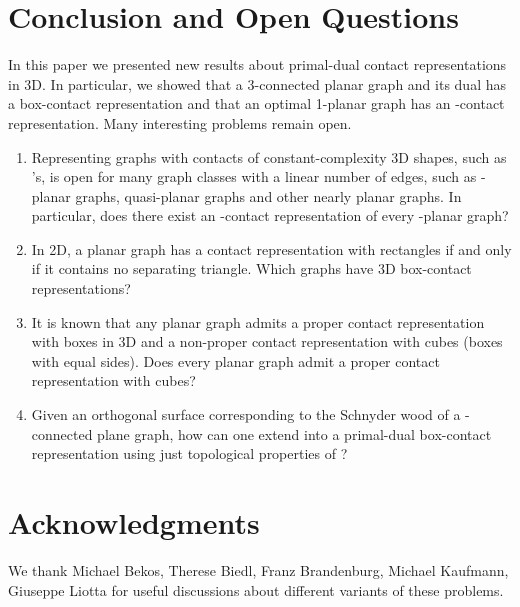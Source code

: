 \documentclass{article}
\newcommand{\LL}{\xspace}
\newcommand{\LLs}{'s\xspace}
\begin{document}
\section{Conclusion and Open Questions}
In this paper we presented new results about primal-dual contact representations in 3D. In particular, we showed that a 3-connected planar graph and its dual has a box-contact representation and that an optimal 1-planar graph has an \LL-contact representation. Many interesting problems remain open.


\begin{enumerate}
\item Representing graphs with contacts of constant-complexity 3D shapes, such as \LLs, is open for many graph
classes with a linear number of edges, such as -planar graphs, quasi-planar graphs and other nearly planar
graphs. In particular, does there exist an \LL-contact representation of every -planar graph?

\item In 2D, a planar graph has a contact representation with rectangles if and only if it
contains no separating triangle.
Which graphs have 3D box-contact representations?

\item It is known that any planar graph admits a proper contact representation
with boxes in 3D and a non-proper contact representation with cubes (boxes with equal sides).
Does every planar graph admit a proper contact representation with cubes?

\item Given an orthogonal surface  corresponding to the Schnyder wood of a -connected plane graph, how can one extend  into a primal-dual box-contact representation using just topological properties of ?
\end{enumerate}


\section*{Acknowledgments}
We thank Michael Bekos, Therese Biedl, Franz Brandenburg, Michael Kaufmann, Giuseppe Liotta for useful discussions about different variants of these problems.
\end{document}
